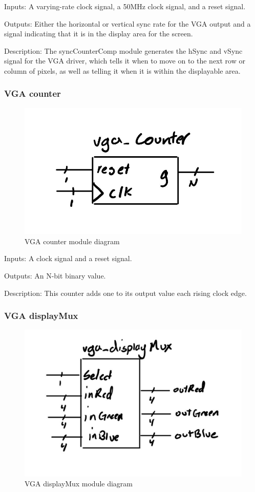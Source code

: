 \documentclass[a4paper]{article}
\begin{document}
Inputs: A varying-rate clock signal, a 50MHz clock signal, and a reset signal.

Outputs: Either the horizontal or vertical sync rate for the VGA output and a signal indicating that it is in the display area for the screen.

Description: The syncCounterComp module generates the hSync and vSync signal for the VGA driver, which tells it when to move on to the next row or column of pixels, as well as telling it when it is within the displayable area.

\subsubsection{VGA counter}

\begin{figure}[H]
    \includegraphics[width=0.8 \linewidth]{images/vgacounter.JPG}
    \caption{VGA counter module diagram}
    \label{vgaCounterDiagram}
\end{figure}

Inputs: A clock signal and a reset signal.

Outputs: An N-bit binary value.

Description: This counter adds one to its output value each rising clock edge.

\subsubsection{VGA displayMux}

\begin{figure}[H]
    \includegraphics[width=0.8 \linewidth]{images/vgadisplayMux.JPG}
    \caption{VGA displayMux module diagram}
    \label{vgaDisplayMuxDiagram}
\end{figure}
\end{document}

